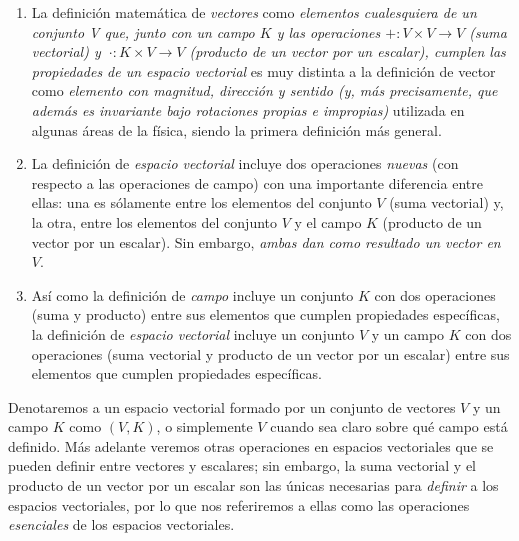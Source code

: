 \documentclass[apuntes]{subfiles}
\begin{document}
\begin{obs}\label{obs:1.5}\leavevmode
 \begin{enumerate}[label=(\arabic*)]

    \item La definición matemática de \emph{vectores} como \emph{elementos cualesquiera de un conjunto V que, junto con un campo $K$ y las operaciones $+:V\times V\to V$ (suma vectorial) y $\ \cdot:K\times V\to V$ (producto de un vector por un escalar), cumplen las propiedades de un espacio vectorial} es muy distinta a la definición de vector como \emph{elemento con magnitud, dirección y sentido (y, más precisamente, que además es invariante bajo rotaciones propias e impropias)} utilizada en algunas áreas de la física, siendo la primera definición más general.

    \item La definición de \emph{espacio vectorial} incluye dos operaciones \emph{nuevas} (con respecto a las operaciones de campo) con una importante diferencia entre ellas: una es sólamente entre los elementos del conjunto $V$ (suma vectorial) y, la otra, entre los elementos del conjunto $V$ y el campo $K$ (producto de un vector por un escalar). Sin embargo, \emph{ambas dan como resultado un vector en $V$}.

    \item Así como la definición de \emph{campo} incluye un conjunto $K$ con dos operaciones (suma y producto) entre sus elementos que cumplen propiedades específicas, la definición de \emph{espacio vectorial} incluye un conjunto $V$ y un campo $K$ con dos operaciones (suma vectorial y producto de un vector por un escalar) entre sus elementos que cumplen propiedades específicas.
\end{enumerate}
\end{obs}

\noindent Denotaremos a un espacio vectorial formado por un conjunto de vectores $V$ y un campo $K$ como $(V,K)$, o simplemente $V$ cuando sea claro sobre qué campo está definido. Más adelante veremos otras operaciones en espacios vectoriales que se pueden definir entre vectores y escalares; sin embargo, la suma vectorial y el producto de un vector por un escalar son las únicas necesarias para \emph{definir} a los espacios vectoriales, por lo que nos referiremos a ellas como las operaciones \emph{esenciales} de los espacios vectoriales.
\end{document}
